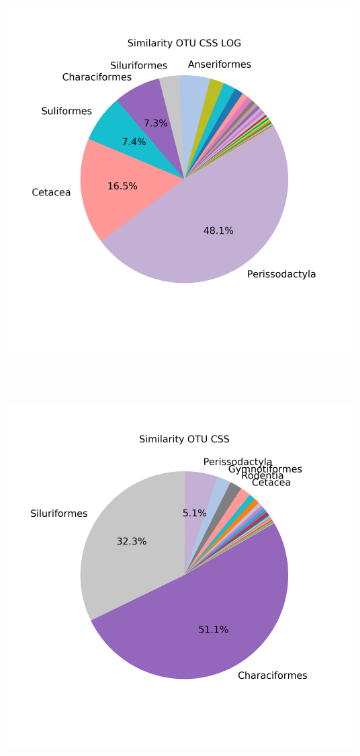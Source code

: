 \begin{figure}[h]
\begin{subfigure}{0.45\textwidth}
		\includegraphics[width=\textwidth]{rfr_sim_mean_pieOTU CSS LOG}
		\caption{}
		\label{fig:simmeanotucsslog}
	\end{subfigure}\\
	\begin{subfigure}{0.45\textwidth}
	\includegraphics[width=\textwidth]{rfr_sim_sum_pieOTU CSS}

\end{subfigure}
\end{figure}
